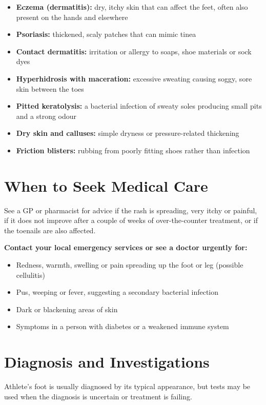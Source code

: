 \begin{itemize}
    \item \textbf{Eczema (dermatitis):} dry, itchy skin that can affect the feet, often also present on the hands and elsewhere
    \item \textbf{Psoriasis:} thickened, scaly patches that can mimic tinea
    \item \textbf{Contact dermatitis:} irritation or allergy to soaps, shoe materials or sock dyes
    \item \textbf{Hyperhidrosis with maceration:} excessive sweating causing soggy, sore skin between the toes
    \item \textbf{Pitted keratolysis:} a bacterial infection of sweaty soles producing small pits and a strong odour
    \item \textbf{Dry skin and calluses:} simple dryness or pressure-related thickening
    \item \textbf{Friction blisters:} rubbing from poorly fitting shoes rather than infection
\end{itemize}

\section*{When to Seek Medical Care}
See a GP or pharmacist for advice if the rash is spreading, very itchy or painful, if it does not improve after a couple of weeks of over-the-counter treatment, or if the toenails are also affected.

\textbf{Contact your local emergency services or see a doctor urgently for:}
\begin{itemize}
    \item Redness, warmth, swelling or pain spreading up the foot or leg (possible cellulitis)
    \item Pus, weeping or fever, suggesting a secondary bacterial infection
    \item Dark or blackening areas of skin
    \item Symptoms in a person with diabetes or a weakened immune system
\end{itemize}

\section*{Diagnosis and Investigations}
Athlete's foot is usually diagnosed by its typical appearance, but tests may be used when the diagnosis is uncertain or treatment is failing.

